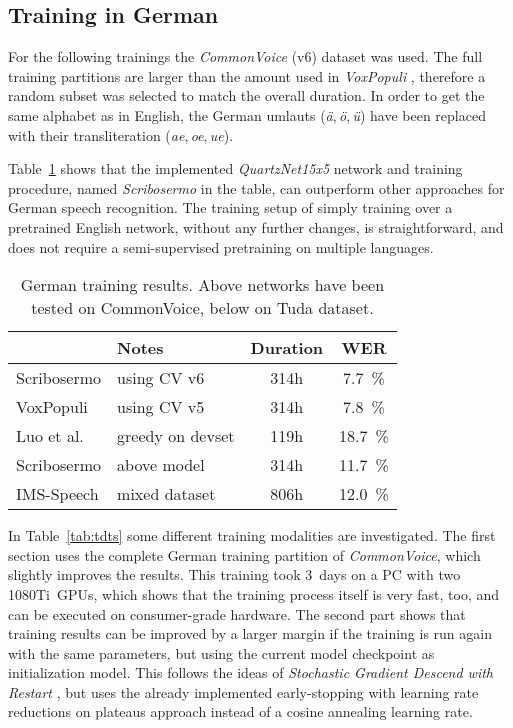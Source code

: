 \documentclass[a4paper]{article}
\begin{document}
\subsection{Training in German}

For the following trainings the \textit{CommonVoice} (v6) dataset was used. The full training partitions are larger than the amount used in \textit{VoxPopuli} \cite{VOXPOP}, therefore a random subset was selected to match the overall duration.
In order to get the same alphabet as in English, the German umlauts (\textit{ä},\,\textit{ö},\,\textit{ü}) have been replaced with their transliteration (\textit{ae},\,\textit{oe},\,\textit{ue}).

Table~\ref{tab:rqn} shows that the implemented \textit{QuartzNet15x5} network and training procedure, named \textit{Scribosermo} in the table, can outperform other approaches for German speech recognition. The training setup of simply training over a pretrained English network, without any further changes, is straightforward, and does not require a semi-supervised pretraining on multiple languages.

\begin{table}[!htbp]
	\caption{German training results. Above networks have been tested on CommonVoice, below on Tuda dataset.}
	\label{tab:rqn}
	\centering
	\begin{tabular}{llcc}
		\toprule
		\textbf{}  & \textbf{Notes}  & \textbf{Duration} & \textbf{WER} \\
		\midrule
		Scribosermo & using CV v6 & 314h  & \SI{7.7}{\percent} \\
		VoxPopuli \cite{VOXPOP} & using CV v5 & 314h &
		\SI{7.8}{\percent} \\
		Luo et al. \cite{QNTECR} & greedy on devset & 119h &
		\SI{18.7}{\percent} \\
		\midrule
		Scribosermo & above model & 314h & \SI{11.7}{\percent} \\
		IMS-Speech \cite{IMSDE} & mixed dataset & 806h & \SI{12.0}{\percent} \\
		\bottomrule
	\end{tabular}
\end{table}

In Table~\ref{tab:tdts} some different training modalities are investigated. The first section uses the complete German training partition of \textit{CommonVoice}, which slightly improves the results. This training took 3~days on a PC with two \mbox{1080Ti GPUs}, which shows that the training process itself is very fast, too, and can be executed on consumer-grade hardware.
The second part shows that training results can be improved by a larger margin if the training is run again with the same parameters, but using the current model checkpoint as initialization model. This follows the ideas of \textit{Stochastic Gradient Descend with Restart} \cite{SGDR}, but uses the already implemented early-stopping with learning rate reductions on plateaus approach instead of a cosine annealing learning rate.
\end{document}
